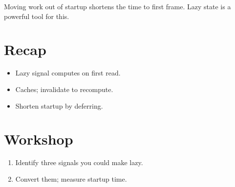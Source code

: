 Moving work out of startup shortens the time to first
frame. Lazy state is a powerful tool for this.

\section{Recap}

\begin{recap}
\begin{itemize}[leftmargin=*]
  \item Lazy signal computes on first read.
  \item Caches; invalidate to recompute.
  \item Shorten startup by deferring.
\end{itemize}
\end{recap}

\section*{Workshop}

\begin{enumerate}[leftmargin=*]
  \item Identify three signals you could make lazy.
  \item Convert them; measure startup time.
\end{enumerate}
